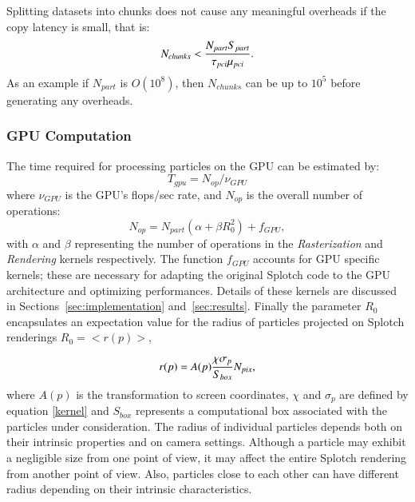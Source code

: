 \documentclass[1p]{elsarticle}
\begin{document}
Splitting datasets into chunks does not cause any meaningful overheads if the copy latency is small, that is:
\begin{equation}
N_{chunks} < {N_{part} S_{part}\over \tau_{pci}\mu_{pci}}.
\end{equation}
As an example if $N_{part}$ is $O(10^8)$, then $N_{chunks}$ can be up to $10^5$ before
generating any overheads. 

\subsubsection{GPU Computation}
The time required for processing particles on the GPU can be estimated by:
\begin{equation}
T_{gpu} = N_{op}/\nu_{GPU}
\end{equation}
where $\nu_{GPU}$ is the GPU's flops/sec rate, and $N_{op}$ is the overall number of operations:
\begin{equation}\label{ops}
N_{op} = N_{part}(\alpha + \beta R_0^2) + f_{GPU},
\end{equation}
with $\alpha$ and $\beta$ representing the number of operations in the \textit{Rasterization} and \textit{Rendering} kernels respectively.
The function $f_{GPU}$ accounts for GPU specific kernels; these are necessary for adapting the original Splotch code to the GPU architecture and optimizing performances. Details of these kernels are discussed in Sections~\ref{sec:implementation} and~\ref{sec:results}.
Finally the parameter $R_0$ encapsulates an expectation value for the radius of particles projected on Splotch renderings $R_0 = <r(p)>$,

\begin{equation}\label{radius}
r(p) = A(p){\chi \sigma_p\over S_{box}} N_{pix},
\end{equation} 
where $A(p)$ is the transformation to screen coordinates, $\chi$ and $\sigma_p$ are defined by equation \eqref{kernel} and $S_{box}$ represents a computational box associated with the particles under consideration. 
The radius of individual particles depends both on their intrinsic properties and on camera settings. Although a particle may exhibit a negligible size from one point of view, it may affect the entire Splotch rendering from another point of view. Also, particles close to each other can have different radius depending on their intrinsic characteristics.
\end{document}
